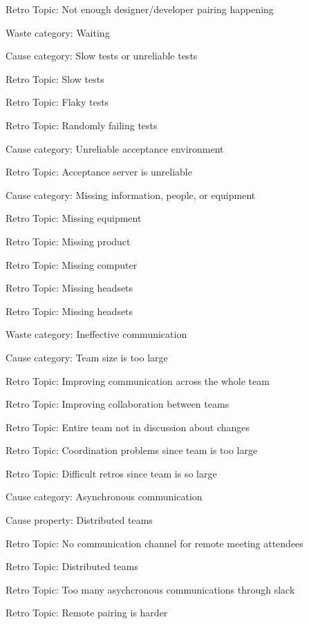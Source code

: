 \quad \quad \quad Retro Topic: Not enough designer/developer pairing happening



Waste category: Waiting

\quad Cause category: Slow tests or unreliable tests

\quad \quad Retro Topic: Slow tests

\quad \quad Retro Topic: Flaky tests

\quad \quad Retro Topic: Randomly failing tests

\quad Cause category: Unreliable acceptance environment

\quad \quad Retro Topic: Acceptance server is unreliable

\quad Cause category: Missing information, people, or equipment

\quad \quad Retro Topic: Missing equipment

\quad \quad Retro Topic: Missing product

\quad \quad Retro Topic: Missing computer

\quad \quad Retro Topic: Missing headsets

\quad \quad Retro Topic: Missing headsets

Waste category: Ineffective communication

\quad Cause category: Team size is too large

\quad \quad Retro Topic: Improving communication across the whole team

\quad \quad Retro Topic: Improving collaboration between teams

\quad \quad Retro Topic: Entire team not in discussion about changes

\quad \quad Retro Topic: Coordination problems since team is too large

\quad \quad Retro Topic: Difficult retros since team is so large

\quad Cause category: Asynchronous communication

\quad \quad Cause property: Distributed teams

\quad \quad \quad Retro Topic: No communication channel for remote meeting attendees

\quad \quad \quad Retro Topic: Distributed teams

\quad \quad \quad Retro Topic: Too many asychcronous communications through slack

\quad \quad \quad Retro Topic: Remote pairing is harder

